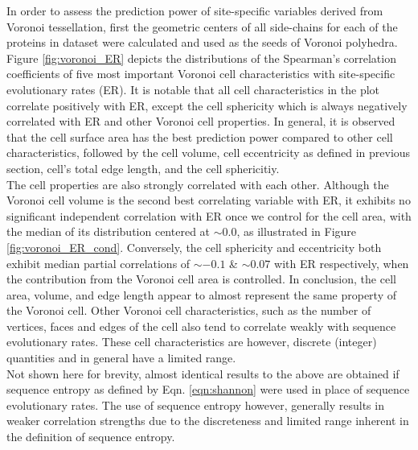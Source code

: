 \documentclass[11pt]{article}
\begin{document}
    In order to assess the prediction power of site-specific variables derived from Voronoi tessellation, first the geometric centers of all side-chains for each of the proteins in dataset were calculated and used as the seeds of Voronoi polyhedra. Figure \ref{fig:voronoi_ER} depicts the distributions of the Spearman's correlation coefficients of five most important Voronoi cell characteristics with site-specific evolutionary rates (ER). It is notable that all cell characteristics in the plot correlate positively with ER, except the cell sphericity which is always negatively correlated with ER and other Voronoi cell properties. In general, it is observed that the cell surface area has the best prediction power compared to other cell characteristics, followed by the cell volume, cell eccentricity as defined in previous section, cell's total edge length, and the cell sphericitiy. \\
    
    The cell properties are also strongly correlated with each other. Although the Voronoi cell volume is the second best correlating variable with ER, it exhibits no significant independent correlation with ER once we control for the cell area, with the median of its distribution centered at $\sim0.0$, as illustrated in Figure \ref{fig:voronoi_ER_cond}. Conversely, the cell sphericity and eccentricity both exhibit median partial correlations of $\sim-0.1$ \& $\sim0.07$ with ER respectively, when the contribution from the Voronoi cell area is controlled. In conclusion, the cell area, volume, and edge length appear to almost represent the same property of the Voronoi cell. Other Voronoi cell characteristics, such as the number of vertices, faces and edges of the cell also tend to correlate weakly with sequence evolutionary rates. These cell characteristics are however, discrete (integer) quantities and in general have a limited range. \\

    Not shown here for brevity, almost identical results to the above are obtained if sequence entropy as defined by Eqn. \ref{eqn:shannon} were used in place of sequence evolutionary rates. The use of sequence entropy however, generally results in weaker correlation strengths due to the discreteness and limited range inherent in the definition of sequence entropy. \\
\end{document}
